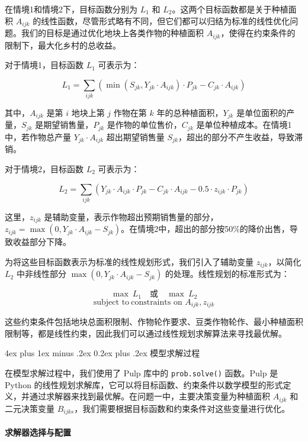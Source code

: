 \documentclass[12pt,a4paper]{nmmcm}
\makeatletter
\renewcommand\subsubsection{\@startsection{subsubsection}{3}{1em}%
  {4ex plus 1ex minus .2ex}%
  {0.2ex plus .2ex}%
  {\normalfont\large\bfseries}}
\makeatother
\begin{document}
在情境1和情境2下，目标函数分别为 $L_1$ 和 $L_2$。这两个目标函数都是关于种植面积 $A_{ijk}$ 的线性函数，尽管形式略有不同，但它们都可以归结为标准的线性优化问题。我们的目标是通过优化地块上各类作物的种植面积 $A_{ijk}$，使得在约束条件的限制下，最大化乡村的总收益。

对于情境1，目标函数 $L_1$ 可表示为：

\[
  L_1 = \sum_{ijk} \left( \min \left( S_{jk}, Y_{jk} \cdot A_{ijk} \right) \cdot P_{jk} - C_{jk} \cdot A_{ijk} \right)
\]

其中，$A_{ijk}$ 是第 $i$ 地块上第 $j$ 作物在第 $k$ 年的总种植面积，$Y_{jk}$ 是单位面积的产量，$S_{jk}$ 是期望销售量，$P_{jk}$ 是作物的单位售价，$C_{jk}$ 是单位种植成本。在情境1中，若作物总产量 $Y_{jk} \cdot A_{ijk}$ 超出期望销售量 $S_{jk}$，超出的部分不产生收益，导致滞销。

对于情境2，目标函数 $L_2$ 可表示为：

\[
  L_2 = \sum_{ijk} \left( Y_{jk} \cdot A_{ijk} \cdot P_{jk} - C_{jk} \cdot A_{ijk} - 0.5 \cdot z_{ijk} \cdot P_{jk} \right)
\]

这里，$z_{ijk}$ 是辅助变量，表示作物超出预期销售量的部分，$z_{ijk} = \max(0, Y_{jk} \cdot A_{ijk} - S_{jk})$。在情境2中，超出的部分按50\%的降价出售，导致收益部分下降。

为将这些目标函数表示为标准的线性规划形式，我们引入了辅助变量 $z_{ijk}$，以简化 $L_2$ 中非线性部分 $\max(0, Y_{jk} \cdot A_{ijk} - S_{jk})$ 的处理。线性规划的标准形式为：

\[
  \max \ L_1 \quad \text{或} \quad \max \ L_2
\]
\[
  \text{subject to} \ \text{constraints on } A_{ijk}, z_{ijk}
\]

这些约束条件包括地块总面积限制、作物轮作要求、豆类作物轮作、最小种植面积限制等，都是线性约束，因此我们可以通过线性规划求解算法来寻找最优解。

\subsubsection{模型求解过程}

在模型求解过程中，我们使用了 Pulp 库中的 \texttt{prob.solve()} 函数。Pulp 是 Python 的线性规划求解库，它可以将目标函数、约束条件以数学模型的形式定义，并通过求解器来找到最优解。在问题一中，主要决策变量为种植面积 $A_{ijk}$ 和二元决策变量 $B_{ijks}$，我们需要根据目标函数和约束条件对这些变量进行优化。

\paragraph{求解器选择与配置}
\end{document}
